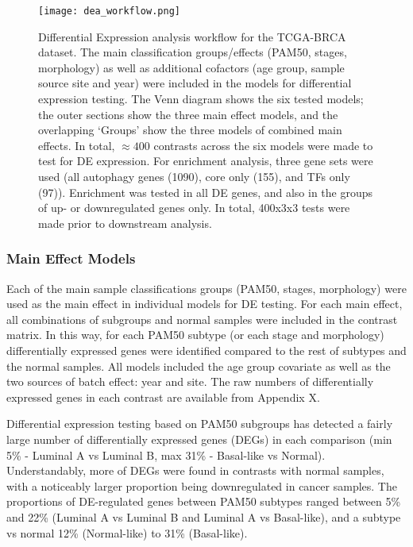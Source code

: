        
            \begin{figure}[!h]
            \centering
            \texttt{[image: dea\_workflow.png]} 
            \caption[Differential Expression Analysis workflow]{Differential Expression analysis workflow for the TCGA-BRCA dataset. The main classification groups/effects (PAM50, stages, morphology) as well as additional cofactors (age group, sample source site and year) were included in the models for differential expression testing. The Venn diagram shows the six tested models; the outer sections show the three main effect models, and the overlapping ‘Groups' show the three models of combined main effects. In total, $\approx 400$ contrasts across the six models were made to test for DE expression. For enrichment analysis, three gene sets were used (all autophagy genes (1090), core only (155), and TFs only (97)). Enrichment was tested in all DE genes, and also in the groups of up- or downregulated genes only. In total, 400x3x3 tests were made prior to downstream analysis.  }
            \label{fig:deaworkflow}
            \end{figure}

        \subsubsection{Main Effect Models}
        
        Each of the main sample classifications groups (PAM50, stages, morphology) were used as the main effect in individual models for DE testing. For each main effect, all combinations of subgroups and normal samples were included in the contrast matrix. In this way, for each PAM50 subtype (or each stage and morphology) differentially expressed genes were identified compared to the rest of subtypes and the normal samples. All models included the age group covariate as well as the two sources of batch effect: year and site. The raw numbers of differentially expressed genes in each contrast are available from Appendix X.

        Differential expression testing based on PAM50 subgroups has detected a fairly large number of differentially expressed genes (DEGs) in each comparison (min 5\% - Luminal A vs Luminal B, max 31\% - Basal-like vs Normal). Understandably, more of DEGs were found in contrasts with normal samples, with a noticeably larger proportion being downregulated in cancer samples. The proportions of DE-regulated genes between PAM50 subtypes ranged between 5\% and 22\% (Luminal A vs Luminal B and Luminal A vs Basal-like), and a subtype vs normal 12\% (Normal-like) to 31\% (Basal-like). 
        
